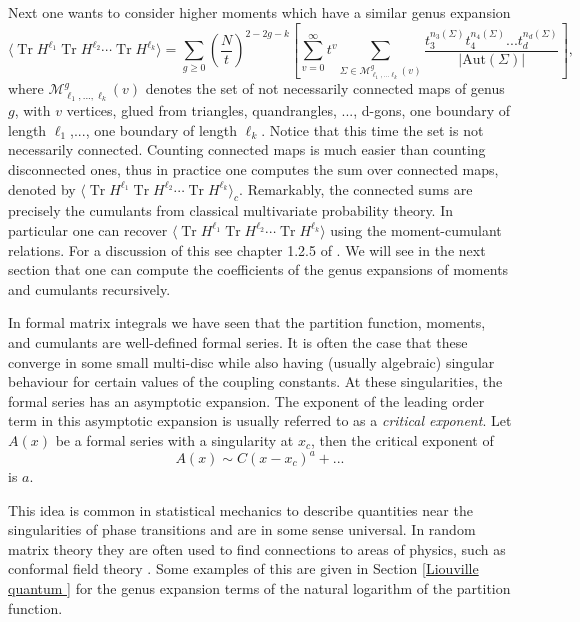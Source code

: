 \documentclass[10pt]{article}
\DeclareMathOperator{\tr}{Tr}
\begin{document}
\begin{appendices}
	Next one wants to consider higher moments which have a similar genus expansion
	\begin{equation*}%
		\langle \tr H^{\ell_{1}}\tr H^{\ell_{2}}\cdots \tr H^{\ell_{k}}\rangle  =\sum_{g \geq 0}\left(\frac{N}{t}\right)^{2-2g-k} \left[\sum_{v=0}^{\infty}t^{v}\sum_{\Sigma\in \mathcal{M}^{g}_{\ell_{1},...\ell_{k}}(v)}\frac{t_{3}^{n_{3}(\Sigma)}t_{4}^{n_{4}(\Sigma)}... t_{d}^{n_{d}(\Sigma)}}{|\text{Aut}(\Sigma)|}\right],
	\end{equation*}
	where $\mathcal{M}^{g}_{\ell_{1},...,\ell_{k}}(v)$ denotes the set of not necessarily connected maps of genus $g$, with $v$ vertices, glued from triangles,  quandrangles, ..., d-gons, one boundary of length $\ell_{1}$,..., one boundary of length $\ell_{k}$. Notice that this time the set is not necessarily connected. Counting connected maps is much easier than counting disconnected ones, thus in practice one computes the sum over connected maps, denoted by	$\langle \tr H^{\ell_{1}}\tr H^{\ell_{2}}\cdots \tr H^{\ell_{k}}\rangle_{c}$. Remarkably, the connected sums are precisely the cumulants from classical multivariate probability theory. In particular one can recover $	\langle \tr H^{\ell_{1}}\tr H^{\ell_{2}}\cdots \tr H^{\ell_{k}}\rangle$ using the moment-cumulant relations. For a discussion of this see chapter 1.2.5 of \cite{Eynard2018}. We will see in the next section that one can compute the coefficients of the genus expansions of moments and cumulants recursively.
	
In formal matrix integrals we have seen that the partition function, moments, and cumulants are well-defined formal series. It is often the case that these converge in some small multi-disc  while also having (usually algebraic) singular behaviour for certain values of the coupling constants. At these singularities, the formal series has an asymptotic expansion. The exponent of the leading order term in this asymptotic expansion is usually referred to as a \textit{critical exponent}. Let $A(x)$ be a formal series with a singularity at $x_{c}$, then the critical exponent of
\begin{equation*}
	A(x)\sim C(x-x_{c})^{a} + ...
\end{equation*}
is $a$. 

This idea is common in statistical mechanics to describe quantities near the singularities of phase transitions and are in some sense universal. In random matrix theory they are often used to find connections to areas of physics, such as conformal field theory \cite{Ds multi 2}. Some examples of this are given in Section \ref{Liouville quantum } for the genus expansion terms of the natural logarithm of the partition function.
	

\end{appendices}
\end{document}
